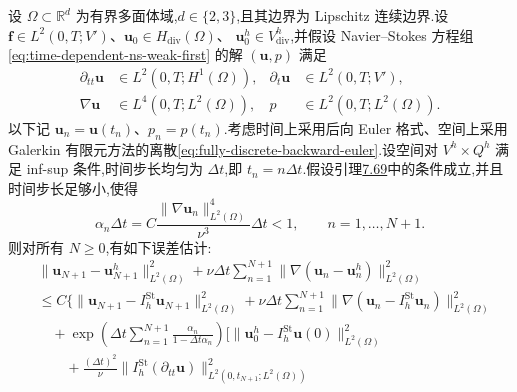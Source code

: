 \begin{theorem}
\label{thm:fully-discrete-backward-euler-velocity-error}\label{thm:time-dependent-fem-fully-discrete-error}
设 $\Omega\subset\mathbb R^d$ 为有界多面体域,$d\in\{2,3\}$,且其边界为 Lipschitz 连续边界.设
$\bm{f}\in L^2(0,T;V')$、$\bm{u}_0\in H_{\mathrm{div}}(\Omega)$、
$\bm{u}_0^h\in V_{\mathrm{div}}^h$,并假设 Navier--Stokes 方程组\cref{eq:time-dependent-ns-weak-first} 的解 $(\bm{u},p)$ 满足
\begin{equation}\label{eq:fully-discrete-backward-euler-error-regularity}
\begin{aligned}
  \partial_{tt}\bm{u}&\in L^2(0,T;H^1(\Omega)),
  &\partial_t\bm{u}&\in L^2(0,T;V'),\\
  \nabla\bm{u}&\in L^4(0,T;L^2(\Omega)),
  &p&\in L^2(0,T;L^2(\Omega)).
\end{aligned}
\end{equation}
以下记 $\bm{u}_n=\bm{u}(t_n)$、$p_n=p(t_n)$.考虑时间上采用后向 Euler 格式、空间上采用 Galerkin 有限元方法的离散\cref{eq:fully-discrete-backward-euler}.设空间对 $V^h\times Q^h$ 满足 inf-sup 条件,时间步长均匀为 $\Delta t$,即 $t_n=n\Delta t$.假设引理\hyperref[lem:fully-discrete-backward-euler-existence-stability]{7.69}中的条件成立,并且时间步长足够小,使得
\begin{equation}\label{eq:fully-discrete-backward-euler-timestep-condition}
  \alpha_n\Delta t
   =C\frac{\|\nabla\bm{u}_n\|_{L^2(\Omega)}^4}{\nu^3}\Delta t<1,
   \qquad n=1,\ldots,N+1.
\end{equation}
则对所有 $N\ge0$,有如下误差估计:
\begin{equation}\label{eq:fully-discrete-backward-euler-velocity-error}
\begin{aligned}
 &\|\bm{u}_{N+1}-\bm{u}_{N+1}^h\|_{L^2(\Omega)}^2
   +\nu\Delta t\sum_{n=1}^{N+1}
       \|\nabla(\bm{u}_n-\bm{u}_n^h)\|_{L^2(\Omega)}^2\\
 &\le C\Biggl\{
       \|\bm{u}_{N+1}-I_h^{\mathrm{St}}\bm{u}_{N+1}\|_{L^2(\Omega)}^2
       +\nu\Delta t\sum_{n=1}^{N+1}
          \|\nabla(\bm{u}_n-I_h^{\mathrm{St}}\bm{u}_n)\|_{L^2(\Omega)}^2\\
 &\quad+\exp\!\left(\Delta t\sum_{n=1}^{N+1}
              \frac{\alpha_n}{1-\Delta t\alpha_n}\right)
       \Biggl[\|\bm{u}_0^h-I_h^{\mathrm{St}}\bm{u}(0)\|_{L^2(\Omega)}^2\\
 &\qquad+\frac{(\Delta t)^2}{\nu}
       \|I_h^{\mathrm{St}}(\partial_{tt}\bm{u})\|_{L^2(0,t_{N+1};L^2(\Omega))}^2\\

\end{aligned}
\end{equation}
\end{theorem}

